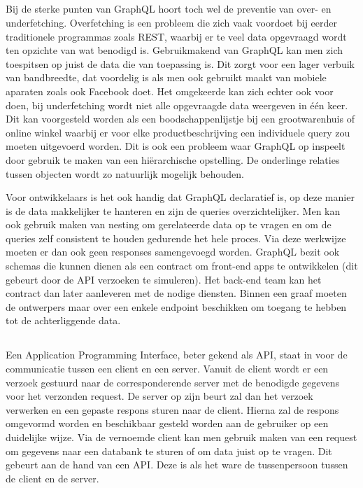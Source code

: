 \subsection{}%
\label{sec:Gebruik}
Bij de sterke punten van GraphQL hoort toch wel de preventie van over- en underfetching. Overfetching is een probleem die zich vaak voordoet bij eerder traditionele programmas zoals REST, waarbij er te veel data opgevraagd wordt ten opzichte van wat benodigd is. Gebruikmakend van GraphQL kan men zich toespitsen op juist de data die van toepassing is. Dit zorgt voor een lager verbuik van bandbreedte, dat voordelig is als men ook gebruikt maakt van mobiele aparaten zoals ook Facebook doet.\autocite{Byron2015} Het omgekeerde kan zich echter ook voor doen, bij underfetching wordt niet alle opgevraagde data weergeven in één keer. Dit kan voorgesteld worden als een boodschappenlijstje bij een grootwarenhuis of online winkel waarbij er voor elke productbeschrijving een individuele query zou moeten uitgevoerd worden. Dit is ook een probleem waar GraphQL op inspeelt door gebruik te maken van een hiërarchische opstelling. De onderlinge relaties tussen objecten wordt zo natuurlijk mogelijk behouden.

Voor ontwikkelaars is het ook handig dat GraphQL declaratief is, op deze manier is de data makkelijker te hanteren en zijn de queries overzichtelijker. Men kan ook gebruik maken van nesting om gerelateerde data op te vragen en om de queries zelf consistent te houden gedurende het hele proces. Via deze werkwijze moeten er dan ook geen responses samengevoegd worden. GraphQL bezit ook schemas die kunnen dienen als een contract om front-end apps te ontwikkelen (dit gebeurt door de API verzoeken te simuleren). Het back-end team kan het contract dan later aanleveren met de nodige diensten. Binnen een graaf moeten de ontwerpers maar over een enkele endpoint beschikken om toegang te hebben tot de achterliggende data.

\subsection{}%
\label{sec:API}
Een Application Programming Interface, beter gekend als API, staat in voor de communicatie tussen een client en een server. Vanuit de client wordt er een verzoek gestuurd naar de corresponderende server met de benodigde gegevens voor het verzonden request. De server op zijn beurt zal dan het verzoek verwerken en een gepaste respons sturen naar de client. Hierna zal de respons omgevormd worden en beschikbaar gesteld worden aan de gebruiker op een duidelijke wijze. Via de vernoemde client kan men gebruik maken van een request om gegevens naar een databank te sturen of om data juist op te vragen. Dit gebeurt aan de hand van een API. Deze is als het ware de tussenpersoon tussen de client en de server.\autocite{Willem2021}

